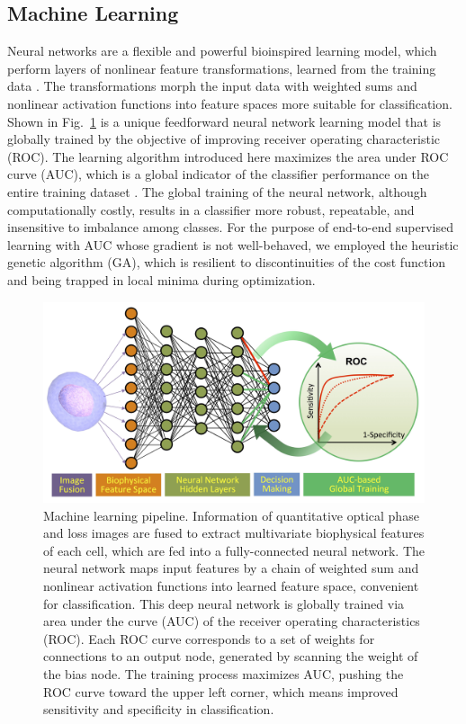 \documentclass[aps,pra,reprint,superscriptaddress]{revtex4-1}
\begin{document}
\subsection*{Machine Learning}

Neural networks are a flexible and powerful bioinspired learning model, which perform layers of nonlinear feature transformations, learned from the training data \cite{abu2012learning, bishop2006pattern, boddy1994neural}. The transformations morph the input data with weighted sums and nonlinear activation functions into feature spaces more suitable for classification. Shown in Fig.~\ref{fig:NeuralNet} is a unique feedforward neural network learning model that is globally trained by the objective of improving receiver operating characteristic (ROC). The learning algorithm introduced here maximizes the area under ROC curve (AUC), which is a global indicator of the classifier performance on the entire training dataset \cite{bradley1997use, powers2007evaluation, huang2005using}. The global training of the neural network, although computationally costly, results in a classifier more robust, repeatable, and insensitive to imbalance among classes. For the purpose of end-to-end supervised learning with AUC whose gradient is not well-behaved, we employed the heuristic genetic algorithm (GA), which is resilient to discontinuities of the cost function and being trapped in local minima during optimization.

\begin{figure}
\includegraphics[scale=0.08]{FigureNeuralNet.jpg}
\caption{\label{fig:NeuralNet} Machine learning pipeline. Information of quantitative optical phase and loss images are fused to extract multivariate biophysical features of each cell, which are fed into a fully-connected neural network. The neural network maps input features by a chain of weighted sum and nonlinear activation functions into learned feature space, convenient for classification. This deep neural network is globally trained via area under the curve (AUC) of the receiver operating characteristics (ROC). Each ROC curve corresponds to a set of weights for connections to an output node, generated by scanning the weight of the bias node. The training process maximizes AUC, pushing the ROC curve toward the upper left corner, which means improved sensitivity and specificity in classification.}
\end{figure}
\end{document}
